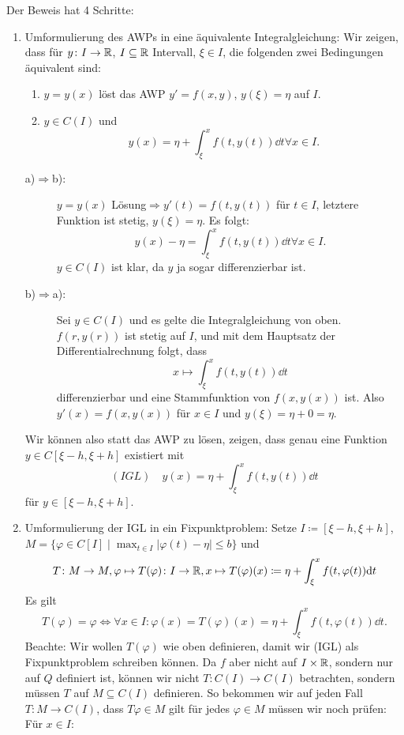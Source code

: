\begin{beweis}
	Der Beweis hat 4 Schritte:
	\begin{enumerate}
		\item Umformulierung des AWPs in eine \"aquivalente Integralgleichung: Wir zeigen, dass f\"ur $ y\colon I\rightarrow\mathbb{R} $, $ I\subseteq\mathbb{R} $ Intervall, $ \xi\in I $, die folgenden zwei Bedingungen \"aquivalent sind:
		\begin{enumerate}
			\item $ y=y(x) $ l\"ost das AWP $ y'=f(x,y) $, $ y(\xi)=\eta $ auf $ I $.
			\item $ y\in C(I) $ und 
			\[ y(x)=\eta+\int_{\xi}^{x}f(t,y(t))\dd t\forall x\in I. \]
		\end{enumerate}
		\begin{description}
			\item[a)$ \Rightarrow $b):] $ y=y(x) $ L\"osung$ \Rightarrow y'(t)=f(t,y(t))$ f\"ur $ t\in I $, letztere Funktion ist stetig, $ y(\xi)=\eta $. Es folgt:
			\[ y(x)-\eta=\int_{\xi}^{x}f(t,y(t))\dd t\forall x\in I. \]
			$ y\in C(I) $ ist klar, da $ y $ ja sogar differenzierbar ist.
			\item[b)$ \Rightarrow $a):] Sei $ y\in C(I) $ und es gelte die Integralgleichung von oben. $ f(r,y(r)) $ ist stetig auf $ I $, und mit dem Hauptsatz der Differentialrechnung folgt, dass
			\[ x\mapsto\int_{\xi}^{x}f(t,y(t)) \dd t \]
			differenzierbar und eine Stammfunktion von $ f(x,y(x)) $ ist. Also $ y'(x)=f(x,y(x)) $ f\"ur $ x\in I $ und $ y(\xi)=\eta+0=\eta $. 
		\end{description}
		Wir k\"onnen also statt das AWP zu l\"osen, zeigen, dass genau eine Funktion $ y\in C[\xi-h,\xi+h] $ existiert mit
		\[ (IGL)\quad y(x)=\eta+\int_{\xi}^{x}f(t,y(t))\dd t \]
		f\"ur $ y\in[\xi-h,\xi+h] $.
		\item Umformulierung der IGL in ein Fixpunktproblem: Setze $ I\coloneqq[\xi-h,\xi+h] $,\\ $ M=\lbrace\varphi\in C[I]\mid\max_{t\in I}|\varphi(t)-\eta|\leq b\rbrace $ und \[ T\colon M\rightarrow M, \varphi\mapsto T(\varphi)\colon I\rightarrow\mathbb{R}, x\mapsto T(\varphi)(x)\coloneqq\eta+\int_{\xi}^{x}f(t,\varphi(t))\mathrm d t \]
		Es gilt \[ T(\varphi)=\varphi\Leftrightarrow\forall x\in I:\varphi(x)=T(\varphi)(x)=\eta+\int_{\xi}^{x}f(t,\varphi(t))\dd t. \]
		Beachte: Wir wollen $ T(\varphi) $ wie oben definieren, damit wir (IGL) als Fixpunktproblem schreiben k\"onnen. Da $ f $ aber nicht auf $ I\times\mathbb{R} $, sondern nur auf $ Q $ definiert ist, k\"onnen wir nicht $ T\colon C(I)\rightarrow C(I) $ betrachten, sondern m\"ussen $ T $ auf $ M\subseteq C(I) $ definieren. So bekommen wir auf jeden Fall $ T\colon M\rightarrow C(I) $, dass $ T\varphi\in M $ gilt f\"ur jedes $ \varphi\in M $ m\"ussen wir noch pr\"ufen: F\"ur $ x\in I: $

\end{enumerate}
\end{beweis}
